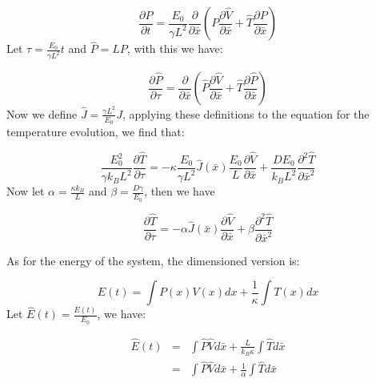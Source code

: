 \begin{equation}
\frac{\partial P}{\partial t} = \frac{E_0}{\gamma L^2} \frac{\partial}{\partial \bar{x}} \left (P \frac{\partial \hat{V}}{\partial \bar{x}} + \hat{T} \frac{\partial P}{\partial \bar{x}} \right )
\end{equation}
Let $\tau = \frac{E_0}{\gamma L^2} t$ and $\hat{P} = L P $, with this we have:

\begin{equation}
\frac{\partial \hat{P}}{\partial \tau} = \frac{\partial}{\partial \bar{x}} \left (\hat{P} \frac{\partial \hat{V}}{\partial \bar{x}} + \hat{T}  \frac{\partial \hat{P}}{\partial \bar{x}} \right ) \label{eqn:dimensionlessSmoluchowski}
\end{equation}
Now we define $\hat{J} = \frac{\gamma L^2}{E_0} J $, applying these definitions to the equation for the temperature evolution, we find that:

\begin{equation}
\frac{E_0^2}{\gamma k_B L^2} \frac{\partial \hat{T}}{\partial \tau} = -\kappa \frac{E_0}{\gamma L^2}\hat{J}(\bar{x}) \frac{E_0}{L} \frac{\partial \hat{V}}{\partial \bar{x}} + \frac{D E_0}{k_B L^2} \frac{\partial^2 \hat{T}}{\partial \bar{x}^2}
\end{equation}
Now let $\alpha = \frac{\kappa k_B}{L}$ and $\beta = \frac{D \gamma}{E_0}$, then we have

\begin{equation}
\frac{\partial \hat{T}}{\partial \tau} = -\alpha \hat{J}(\bar{x}) \frac{\partial \hat{V}}{\partial \bar{x}} + \beta \frac{\partial^2 \hat{T}}{\partial \bar{x}^2} \label{eqn:dimensionlessHeat}
\end{equation}

As for the energy of the system, the dimensioned version is:

\begin{equation}
E(t) = \int P(x) V(x) dx + \frac{1}{\kappa} \int T(x) dx
\end{equation}
Let $\hat{E}(t) = \frac{E(t)}{E_0}$, we have:

\begin{eqnarray}
\hat{E}(t) & = & \int \hat{P} \hat{V} d \bar{x} + \frac{L}{k_B \kappa} \int \hat{T} d\bar{x} \\
              & = & \int \hat{P} \hat{V} d \bar{x} + \frac{1}{\alpha} \int \hat{T} d\bar{x}
\end{eqnarray}


